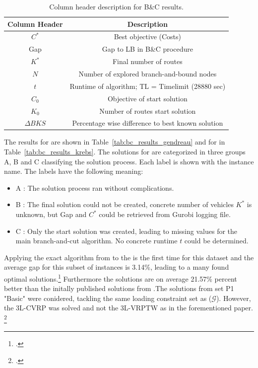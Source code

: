 \begin{table}[ht]
    \centering
    \begin{tabular}{cc}
        \toprule
        Column Header & Description                                       \\
        \midrule
        $C^*$         & Best objective (Costs)                            \\
        Gap           & Gap to \gls{LB} in B\&C procedure                 \\
        $K^*$         & Final number of routes                            \\
        $N$           & Number of explored branch-and-bound nodes         \\
        $t$           & Runtime of algorithm; TL = Timelimit (28880 sec)  \\
        $C_0$         & Objective of start solution                       \\
        $K_0$         & Number of routes start solution                   \\
        $\Delta BKS$  & Percentage wise difference to best known solution \\
        \bottomrule
    \end{tabular}
    \caption{Column header description for B\&C results.}
    \label{tab:column_header_description_bc}
\end{table}

The results for \gendreauDataSetText are shown in Table~\ref{tab:bc_results_gendreau} and for \krebsADataSetText in Table~\ref{tab:bc_results_krebs}.
The solutions for \krebsADataSetText are categorized in three groups A, B and C classifying the solution process. Each label is shown
with the instance name. The labels have the following meaning:
\begin{itemize}
    \item A : The solution process ran without complications.
    \item B : The final solution could not be created, concrete number of vehicles $K^*$ is unknown, but Gap and $C^*$ could be retrieved from Gurobi logging file.
    \item C : Only the start solution was created, leading to missing values for the main branch-and-cut algorithm. No concrete runtime $t$ could be determined.
\end{itemize}

Applying the exact algorithm from \cite{tamke_branch-and-cut_2024} to the \krebsADataSetText is the first time for this dataset and the
average gap for this subset of instances is 3.14\%, leading to a many found optimal solutions.\footcite[cf.]{tamke_branch-and-cut_2024} Furthermore the solutions are on average
21.57\% percent better than the initally published solutions from \cite{krebs_advanced_2021}.The solutions from set P1 "Basic" were
conidered, tackling the same loading constraint set as \cite{gendreau_tabu_2006} ($\mathcal{G}$). However, the \gls{3L-CVRP} was solved and not
the \gls{3L-VRPTW} as in the forementioned paper. \footcite[cf.][pp. 858-864]{krebs_advanced_2021}

